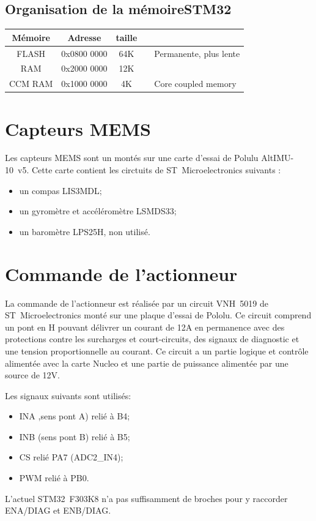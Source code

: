 \documentclass[a4paper,11pt]{report}
\begin{document}
\subsection{Organisation de la mémoireSTM32}

\begin{tabular}{|c|c|c|c|p{5cm}|}
	\hline 
	Mémoire & Adresse     & taille &  &  \\ 
	\hline 
	FLASH   & 0x0800 0000 & 64K &  &  Permanente, plus lente \\ 
	RAM     & 0x2000 0000 & 12K &  &  \\ 
	CCM RAM & 0x1000 0000 &  4K &  &  Core coupled memory\\ 
	\hline
\end{tabular}

\section{Capteurs MEMS}
Les capteurs MEMS sont un montés sur une carte d'essai de Polulu AltIMU-10~v5.
Cette carte contient les circtuits de ST~Microelectronics suivants :
\begin{itemize}
	\item un compas LIS3MDL;
	\item un gyromètre et accéléromètre LSMDS33;
	\item un baromètre LPS25H, non utilisé.
\end{itemize}

\section{Commande de l'actionneur}
La commande de l'actionneur est réalisée par un circuit VNH~5019 de ST~Microelectronics monté sur une plaque d'essai de Pololu.
Ce circuit comprend un pont en H pouvant délivrer un courant de 12A en permanence avec des protections contre les surcharges et court-circuits,
des signaux de diagnostic et une tension proportionnelle au courant.
Ce circuit a un partie logique et contrôle alimentée avec la carte Nucleo
et une partie de puissance alimentée par une source de 12V.

Les signaux suivants sont utilisés:
\begin{itemize}
	\item INA ,sens pont A) relié à B4;
	\item INB (sens pont B) relié à B5;
	\item CS relié PA7 (ADC2\_IN4);
	\item PWM relié à PB0.
\end{itemize}
L'actuel STM32~F303K8 n'a pas suffisamment de broches pour y raccorder ENA/DIAG et ENB/DIAG.
\end{document}
